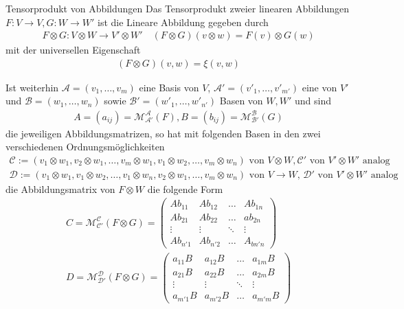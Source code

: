 \begin{definition}{Tensorprodukt von Abbildungen}
    Das Tensorprodukt zweier linearen Abbildungen $F: V \to V, G: W \to W'$ ist die Lineare Abbildung gegeben durch
    \begin{align*}
        F \otimes G: V \otimes W \to V' \otimes W' \quad (F \otimes G)(v \otimes w) = F(v) \otimes G(w)
    \end{align*}
    mit der universellen Eigenschaft 
    \begin{align*}
        (F \otimes G)(v,w) = \xi(v,w)
    \end{align*}
\end{definition}
Ist weiterhin $\mathcal{A} = (v_{1}, \ldots, v_{m})$ eine Basis von $V$, $\mathcal{A'} = (v'_{1}, \ldots, v'_{m'})$ eine von $V'$ und $\mathcal{B} = (w_{1}, \ldots, w_{n})$ sowie $\mathcal{B'} = (w'_{1}, \ldots, w'_{n'})$ Basen von $W,W'$ und sind 
\begin{align*}
    A = (a_{ij}) = \mathcal{M}_{\mathcal{A'}}^{\mathcal{A}}(F), B = (b_{ij}) = \mathcal{M}_{\mathcal{B'}}^{\mathcal{B}}(G)
\end{align*}
die jeweiligen Abbildungsmatrizen, so hat mit folgenden Basen in den zwei verschiedenen Ordnungsmöglichkeiten
\begin{align*}
    \mathcal{C} := (v_1 \otimes w_1, v_2 \otimes w_1, \ldots, v_m \otimes w_1, v_1 \otimes w_2, \ldots, v_m \otimes w_n) \text{ von $V \otimes W, \mathcal{C'}$ von $V' \otimes W'$ analog}\\
    \mathcal{D} := (v_1 \otimes w_1, v_1 \otimes w_2, \ldots, v_1 \otimes w_n, v_2 \otimes w_1, \ldots, v_m \otimes w_n) \text{ von $V \to W$, $\mathcal{D'}$ von $V' \otimes W'$ analog}
\end{align*}
die Abbildungsmatrix von $F \otimes W$ die folgende Form
\begin{align*}
    C = \mathcal{M}_{\mathcal{C}'}^{\mathcal{C}}(F \otimes G) = \begin{pmatrix}
        Ab_{11} & Ab_{12} & \dots & Ab_{1n}\\
        Ab_{21} & Ab_{22} & \dots & ab_{2n}\\
        \vdots & \vdots & \ddots & \vdots\\
        Ab_{n'1} & Ab_{n'2} & \dots & A_{bn'n}
    \end{pmatrix}\\
    D = \mathcal{M}_{\mathcal{D}'}^{\mathcal{D}}(F \otimes G) = \begin{pmatrix}
        a_{11}B & a_{12}B & \dots & a_{1m}B\\
        a_{21}B & a_{22}B & \dots & a_{2m}B\\
        \vdots & \vdots & \ddots & \vdots\\
        a_{m'1}B & a_{m'2}B & \dots & a_{m'm}B
    \end{pmatrix}
\end{align*}
